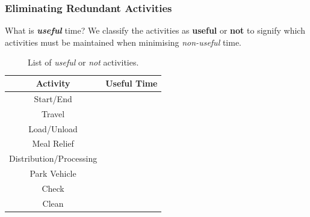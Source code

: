 \documentclass[handout]{beamer}
\newcommand{\cmark}{\ding{51}}%
\newcommand{\xmark}{\ding{55}}%
\begin{document}
\begin{frame}
	\frametitle{Eliminating Redundant Activities}
	\vspace{\baselineskip}
	
	\begin{block}{What is \textbf{\textit{useful}} time?}
	 We classify the activities as \textbf{useful} or \textbf{not} to signify which activities must be maintained when minimising \textit{non-useful} time.
	\end{block}
	
	\begin{table}[ht]
    \small
    \centering 
    \begin{tabular}{|c|c|}
        \hline
        \textbf{Activity} & Useful Time \\
        \hline
        Start/End & \cmark \\
        \hline
        Travel & \cmark\\ 
        \hline
        Load/Unload & \cmark\\ 
        \hline
        Meal Relief & \cmark\\ 
        \hline
        Distribution/Processing & \xmark\\     
        \hline
        Park Vehicle & \xmark\\ 
        \hline
        Check & \xmark\\ 
        \hline
        Clean & \xmark\\ 
        \hline
    \end{tabular}
    \medbreak
    \caption{List of \textit{useful} or \textit{not} activities.}
    \label{table:Useful time}
\end{table}
    	\vspace{\baselineskip}
    	\vspace{\baselineskip}
\end{frame}


\end{document}
